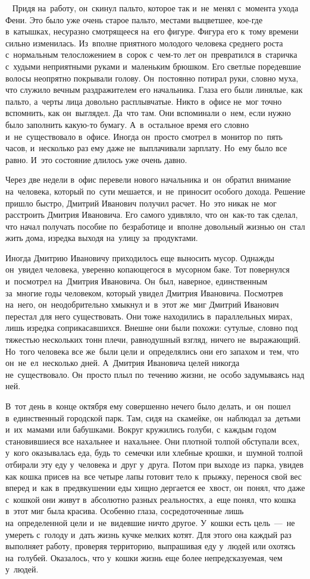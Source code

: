 ~
Придя на~работу, он~скинул пальто, которое так и~не~менял с~момента ухода Фени.
Это было уже очень старое пальто, местами выцветшее, кое-где в~катышках, несуразно смотрящееся на~его фигуре.
Фигура его к~тому времени сильно изменилась.
Из~вполне приятного молодого человека среднего роста с~нормальным телосложением в~сорок с~чем-то лет он~превратился в~старичка с~худыми неприятными руками и~маленьким брюшком.
Его светлые поредевшие волосы неопрятно покрывали голову.
Он~постоянно потирал руки, словно муха, что служило вечным раздражителем его начальника.
Глаза его были линялые, как пальто, а~черты лица довольно расплывчатые.
Никто в~офисе не~мог точно вспомнить, как он~выглядел.
Да~что там.
Они вспоминали о~нем, если нужно было заполнить какую-то бумагу.
А~в~остальное время его словно и~не~существовало в~офисе.
Иногда он~просто смотрел в~монитор по~пять часов, и~несколько раз ему даже не~выплачивали зарплату.
Но~ему было все равно.
И~это состояние длилось уже очень давно.
 
Через две недели в~офис перевели нового начальника и~он~обратил внимание на~человека, который по~сути мешается, и~не~приносит особого дохода.
Решение пришло быстро, Дмитрий Иванович получил расчет.
Но~это никак не~мог расстроить Дмитрия Ивановича.
Его самого удивляло, что он~как-то так сделал, что начал получать пособие по~безработице и~вполне довольный жизнью он~стал жить дома, изредка выходя на~улицу за~продуктами.
 
Иногда Дмитрию Ивановичу приходилось еще выносить мусор.
Однажды он~увидел человека, уверенно копающегося в~мусорном баке.
Тот повернулся и~посмотрел на~Дмитрия Ивановича.
Он~был, наверное, единственным за~многие годы человеком, который увидел Дмитрия Ивановича.
Посмотрев на~него, он~неодобрительно хмыкнул и~в~этот же~миг Дмитрий Иванович перестал для него существовать.
Они тоже находились в~параллельных мирах, лишь изредка соприкасавшихся.
Внешне они были похожи: сутулые, словно под тяжестью нескольких тонн плечи, равнодушный взгляд, ничего не~выражающий.
Но~того человека все же~были цели и~определялись они его запахом и~тем, что он~не~ел~несколько дней.
А~Дмитрия Ивановича целей никогда не~существовало.
Он~просто плыл по~течению жизни, не~особо задумываясь над ней.
 
В~тот день в~конце октября ему совершенно нечего было делать, и~он~пошел в~единственный городской парк.
Там, сидя на~скамейке, он~наблюдал за~детьми и~их~мамами или бабушками.
Вокруг кружились голуби, с~каждым годом становившиеся все нахальнее и~нахальнее.
Они плотной толпой обступали всех, у~кого оказывалась еда, будь то~семечки или хлебные крошки, и~шумной толпой отбирали эту еду у~человека и~друг у~друга.
Потом при выходе из~парка, увидев как кошка присев на~все четыре лапы готовит тело к~прыжку, перенося свой вес вперед и~как в~предвкушении еды хищно дергается ее~хвост, он~понял, что даже с~кошкой они живут в~абсолютно разных реальностях, а~еще понял, что кошка в~этот миг была красива.
Особенно глаза, сосредоточенные лишь на~определенной цели и~не~видевшие ничто другое.
У~кошки есть цель~---~не умереть с~голоду и~дать жизнь кучке мелких котят.
Для этого она каждый раз выполняет работу, проверяя территорию, выпрашивая еду у~людей или охотясь на~голубей.
Оказалось, что у~кошки жизнь еще более непредсказуемая, чем у~людей.
 
